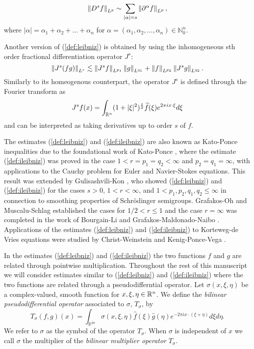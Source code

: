 \[\left\|D^s f\right\|_{L^p} \sim \sum_{|\alpha| = s} \left\|\partial^\alpha f\right\|_{L^p},\]
where $|\alpha| = \alpha_1 + \alpha_2 + ... + \alpha_n$ for $\alpha = (\alpha_1,\alpha_2,...,\alpha_n) \in \mathbb{N}^n_0.$

 Another version of (\ref{def:leibniz}) is obtained by using the inhomogeneous sth order fractional differentiation operator $J^s$:
\begin{equation}\label{def:ileibniz}
\left\|J^s(fg)\right\|_{L^r} \lesssim \left\|J^s f\right\|_{L^{p_1}}\left\|g\right\|_{L^{q_1}} + \left\|f\right\|_{L^{p_2}}\left\|J^s g\right\|_{L^{q_2}}.
\end{equation}
Similarly to its homeogenous counterpart, the operator $J^s$ is defined through the Fourier transform as 
\[ J^s f(x) = \int_{{{\mathbb R}^n}} (1+|\xi|^2)^\frac{s}{2} \widehat{f}(\xi)e^{2\pi i x\cdot\xi} d\xi\]
and can be interpreted as taking derivatives up to order $s$ of $f$.
 
The estimates (\ref{def:leibniz}) and (\ref{def:ileibniz}) are also known as Kato-Ponce inequalities due to the foundational work of Kato-Ponce \cite{MR951744}, where the estimate (\ref{def:ileibniz}) was proved in the case $1<r=p_1=q_2<\infty$ and $p_2=q_1=\infty$, with applications to the Cauchy problem for Euler and Navier-Stokes equations. This result was extended by Gulisashvili-Kon \cite{MR1420922}, who showed (\ref{def:leibniz}) and (\ref{def:ileibniz}) for the cases $s>0$, $1<r<\infty$, and $1 < p_1,p_2,q_1,q_2\leq\infty$ in connection to smoothing properties of Schr\"odinger semigroups. Grafakos-Oh \cite{MR3200091} and Muscalu-Schlag \cite{MR3052499} established the cases for $1/2 <r\leq 1$ and the case $r=\infty$ was completed in the work of Bourgain-Li \cite{MR3263081} and Grafakos-Maldonado-Naibo \cite{MR3189525}. Applications of the estimates (\ref{def:leibniz}) and (\ref{def:ileibniz}) to Korteweg-de Vries equations were studied by Christ-Weinstein \cite{MR1124294} and Kenig-Ponce-Vega \cite{MR1211741}.

In the estimates (\ref{def:leibniz}) and (\ref{def:ileibniz}) the two functions $f$ and $g$ are related through pointwise multiplication. Throughout the rest of this manuscript we will consider estimates similar to (\ref{def:leibniz}) and (\ref{def:ileibniz}) where the two functions are related through a pseudodifferntial operator. Let $\sigma(x,\xi,\eta)$ be a complex-valued, smooth function for $x,\xi,\eta\in{{\mathbb R}^n}$. We define the \textit{bilinear pseudodifferential operator}  associated to $\sigma$, $T_\sigma$, by 
\[T_{\sigma}(f,g)(x) = \int_{\mathbb{R}^{2n}} \sigma(x,\xi,\eta) \widehat{f}(\xi)\widehat{g}(\eta)e^{-2\pi i x\cdot(\xi+\eta)}d\xi d\eta. \]
We refer to $\sigma$ as the symbol of the operator $T_\sigma$. When $\sigma$ is independent of $x$ we call $\sigma$ the multiplier of the \textit{bilinear multiplier operator} $T_\sigma$. 


